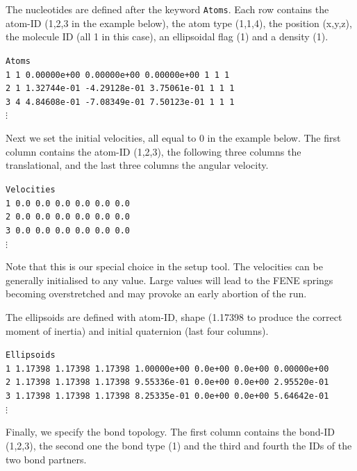 \documentclass[12pt,onecolumn]{article}
\begin{document}
\noindent The nucleotides are defined after the keyword \texttt{Atoms}.
Each row contains the atom-ID (1,2,3 in the example below), the atom type (1,1,4), the position (x,y,z), 
the molecule ID (all 1 in this case), an ellipsoidal flag (1) and a density (1). 

\smallskip
\texttt{Atoms\\
\vspace*{0.3cm}
1  1  0.00000e+00  0.00000e+00  0.00000e+00  1 1 1\\
2  1  1.32744e-01 -4.29128e-01  3.75061e-01  1 1 1\\
3  4  4.84608e-01 -7.08349e-01  7.50123e-01  1 1 1\\
$\vdots$
}
\smallskip

\noindent Next we set the initial velocities, all equal to 0 in the example below.
The first column contains the atom-ID (1,2,3), the following three columns the translational,
and the last three columns the angular velocity.

\smallskip
\texttt{Velocities\\
\vspace*{0.3cm}
1  0.0  0.0  0.0  0.0  0.0  0.0\\ 
2  0.0  0.0  0.0  0.0  0.0  0.0\\ 
3  0.0  0.0  0.0  0.0  0.0  0.0\\
$\vdots$
}
\smallskip

\noindent Note that this is our special choice in the setup tool. The velocities can be generally initialised to any value.
Large values will lead to the FENE springs becoming overstretched and may provoke an early abortion of the run. 

\noindent The ellipsoids are defined with atom-ID, shape (1.17398 to produce the correct moment of inertia) 
and initial quaternion (last four columns). 

\smallskip
\texttt{Ellipsoids\\
\vspace*{0.3cm}
1   1.17398 1.17398 1.17398  1.00000e+00  0.0e+00  0.0e+00  0.00000e+00\\
2   1.17398 1.17398 1.17398  9.55336e-01  0.0e+00  0.0e+00  2.95520e-01\\
3   1.17398 1.17398 1.17398  8.25335e-01  0.0e+00  0.0e+00  5.64642e-01\\
$\vdots$
}
\smallskip

\noindent Finally, we specify the bond topology. The first column contains the bond-ID (1,2,3),
the second one the bond type (1) and the third and fourth the IDs of the two bond partners.
\end{document}
